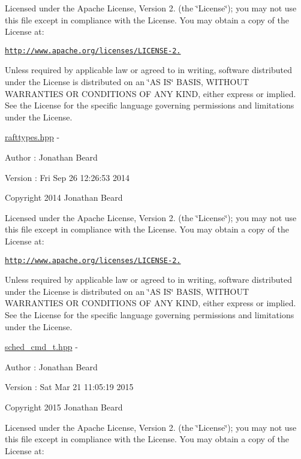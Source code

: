 Licensed under the Apache License, Version 2. (the \char`\"{}\+License\char`\"{}); you may not use this file except in compliance with the License. You may obtain a copy of the License at\+:

\href{http://www.apache.org/licenses/LICENSE-2.0}{\tt http\+://www.\+apache.\+org/licenses/\+L\+I\+C\+E\+N\+S\+E-\/2.}

Unless required by applicable law or agreed to in writing, software distributed under the License is distributed on an \char`\"{}\+A\+S I\+S\char`\"{} B\+A\+S\+I\+S, W\+I\+T\+H\+O\+U\+T W\+A\+R\+R\+A\+N\+T\+I\+E\+S O\+R C\+O\+N\+D\+I\+T\+I\+O\+N\+S O\+F A\+N\+Y K\+I\+N\+D, either express or implied. See the License for the specific language governing permissions and limitations under the License.

\hyperlink{rafttypes_8hpp_source}{rafttypes.\+hpp} -\/ \begin{DoxyAuthor}{Author}
\+: Jonathan Beard 
\end{DoxyAuthor}
\begin{DoxyVersion}{Version}
\+: Fri Sep 26 12\+:26\+:53 2014
\end{DoxyVersion}
Copyright 2014 Jonathan Beard

Licensed under the Apache License, Version 2. (the \char`\"{}\+License\char`\"{}); you may not use this file except in compliance with the License. You may obtain a copy of the License at\+:

\href{http://www.apache.org/licenses/LICENSE-2.0}{\tt http\+://www.\+apache.\+org/licenses/\+L\+I\+C\+E\+N\+S\+E-\/2.}

Unless required by applicable law or agreed to in writing, software distributed under the License is distributed on an \char`\"{}\+A\+S I\+S\char`\"{} B\+A\+S\+I\+S, W\+I\+T\+H\+O\+U\+T W\+A\+R\+R\+A\+N\+T\+I\+E\+S O\+R C\+O\+N\+D\+I\+T\+I\+O\+N\+S O\+F A\+N\+Y K\+I\+N\+D, either express or implied. See the License for the specific language governing permissions and limitations under the License.

\hyperlink{sched__cmd__t_8hpp_source}{sched\+\_\+cmd\+\_\+t.\+hpp} -\/ \begin{DoxyAuthor}{Author}
\+: Jonathan Beard 
\end{DoxyAuthor}
\begin{DoxyVersion}{Version}
\+: Sat Mar 21 11\+:05\+:19 2015
\end{DoxyVersion}
Copyright 2015 Jonathan Beard

Licensed under the Apache License, Version 2. (the \char`\"{}\+License\char`\"{}); you may not use this file except in compliance with the License. You may obtain a copy of the License at\+:

